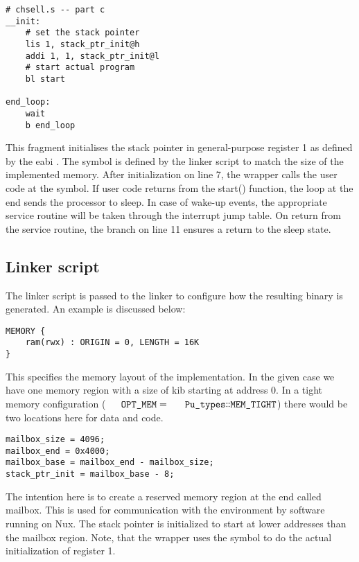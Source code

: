 \begin{lstlisting}[language=powerasm]
# chsell.s -- part c
__init:
	# set the stack pointer
	lis 1, stack_ptr_init@h
	addi 1, 1, stack_ptr_init@l
	# start actual program
	bl start

end_loop:
	wait
	b end_loop
\end{lstlisting}
This fragment initialises the stack pointer in general-purpose register 1 as defined by the \gls{eabi} \citep{IBM1998}.
The symbol  is defined by the linker script to match the size of the implemented memory.
After initialization on line 7, the wrapper calls the user code at the  symbol.
If user code returns from the start() function, the loop at the end sends the processor to sleep.
In case of wake-up events, the appropriate service routine will be taken through the interrupt jump table.
On return from the service routine, the branch on line 11 ensures a return to the sleep state.


\subsection{Linker script}
The linker script  is passed to the linker to configure how the resulting binary is generated.
An example is discussed below:

\begin{lstlisting}
MEMORY {
	ram(rwx) : ORIGIN = 0, LENGTH = 16K
}
\end{lstlisting}
This specifies the memory layout of the implementation.
In the given case we have one memory region with a size of \unit[16]{kib} starting at address 0.
In a tight memory configuration ($ \code{OPT_MEM} = \code{Pu_types::MEM_TIGHT}$) there would be two locations here for data and code.


\begin{lstlisting}
mailbox_size = 4096;
mailbox_end = 0x4000;
mailbox_base = mailbox_end - mailbox_size;
stack_ptr_init = mailbox_base - 8;
\end{lstlisting}
The intention here is to create a reserved memory region at the end called mailbox.
This is used for communication with the environment by software running on Nux.
The stack pointer is initialized to start at lower addresses than the mailbox region.
Note, that the  wrapper uses the  symbol to do the actual initialization of register 1.


